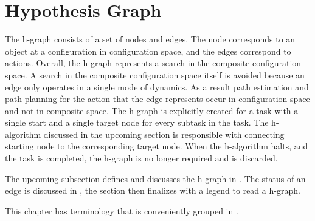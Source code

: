 \section{Hypothesis Graph}%
\label{sec:h-graph}
The \acf{h-graph} consists of a set of nodes and edges. The node corresponds to an object at a configuration in configuration space, and the edges correspond to actions. Overall, the \ac{h-graph} represents a search in the composite configuration space. A search in the composite configuration space itself is avoided because an edge only operates in a single mode of dynamics. As a result path estimation and path planning for the action that the edge represents occur in configuration space and not in composite space. The \ac{h-graph} is explicitly created for a task with a single start and a single target node for every subtask in the task. The \ac{h-algorithm} discussed in the upcoming section is responsible with connecting starting node to the corresponding target node. When the \ac{h-algorithm} halts, and the task is completed, the \ac{h-graph} is no longer required and is discarded.\bs

The upcoming subsection defines and discusses the \ac{h-graph} in . The status of an edge is discussed in , the section then finalizes with a legend to read a \ac{h-graph}.\bs



This chapter has terminology that is conveniently grouped in .\bs

